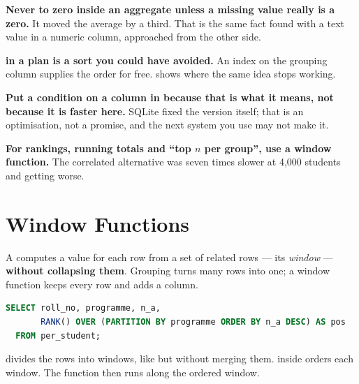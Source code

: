 \begin{alertbox}
\begin{tight}
  \item \textbf{Never  to zero inside an aggregate unless a
        missing value really is a zero.} It moved the average by a third.
        That is the same fact  found with a text value in a numeric
        column, approached from the other side.
  \item \textbf{ in a plan is a sort you could have avoided.}
        An index on the grouping column supplies the order for free.
         shows where the same idea stops working.
  \item \textbf{Put a condition on a column in  because that is
        what it means, not because it is faster here.} SQLite fixed the
         version itself; that is an optimisation, not a promise,
        and the next system you use may not make it.
  \item \textbf{For rankings, running totals and ``top $n$ per group'', use a
        window function.} The correlated alternative was seven times slower at
        4{,}000 students and getting worse.
\end{tight}
\end{alertbox}

\section{Window Functions}

\begin{definitionbox}
A  computes a value for each row from a set of related
rows --- its \emph{window} --- \textbf{without collapsing them}. Grouping turns
many rows into one; a window function keeps every row and adds a column.

\begin{lstlisting}[language=sql]
SELECT roll_no, programme, n_a,
       RANK() OVER (PARTITION BY programme ORDER BY n_a DESC) AS pos
  FROM per_student;
\end{lstlisting}

\smallskip
{} divides the rows into windows, like  but
without merging them.  inside  orders each window.
The function then runs along the ordered window.
\end{definitionbox}

